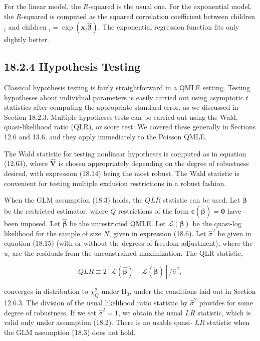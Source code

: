 \documentclass[10pt]{article}
\begin{document}
For the linear model, the $R$-squared is the usual one. For the exponential model, the $R$-squared is computed as the squared correlation coefficient between children ${ }_{i}$ and children $_{i}=\exp \left(\mathbf{x}_{i} \hat{\boldsymbol{\beta}}\right)$. The exponential regression function fits only slightly better.

\subsection*{18.2.4 Hypothesis Testing}
Classical hypothesis testing is fairly straightforward in a QMLE setting. Testing hypotheses about individual parameters is easily carried out using asymptotic $t$ statistics after computing the appropriate standard error, as we discussed in Section 18.2.3. Multiple hypotheses tests can be carried out using the Wald, quasi-likelihood ratio (QLR), or score test. We covered these generally in Sections 12.6 and 13.6, and they apply immediately to the Poisson QMLE.

The Wald statistic for testing nonlinear hypotheses is computed as in equation (12.63), where $\hat{\mathbf{V}}$ is chosen appropriately depending on the degree of robustness desired, with expression (18.14) being the most robust. The Wald statistic is convenient for testing multiple exclusion restrictions in a robust fashion.

When the GLM assumption (18.3) holds, the $Q L R$ statistic can be used. Let $\check{\boldsymbol{\beta}}$ be the restricted estimator, where $Q$ restrictions of the form $\mathbf{c}(\check{\boldsymbol{\beta}})=\mathbf{0}$ have been imposed. Let $\hat{\boldsymbol{\beta}}$ be the unrestricted QMLE. Let $\mathscr{L}(\boldsymbol{\beta})$ be the quasi-log likelihood for the sample of size $N$, given in expression (18.6). Let $\hat{\sigma}^{2}$ be given in equation (18.15) (with or without the degrees-of-freedom adjustment), where the $\hat{u}_{i}$ are the residuals from the unconstrained maximization. The QLR statistic,


\begin{equation*}
Q L R \equiv 2[\mathscr{L}(\hat{\boldsymbol{\beta}})-\mathscr{L}(\check{\boldsymbol{\beta}})] / \hat{\sigma}^{2}, \tag{18.17}
\end{equation*}


converges in distribution to $\chi_{Q}^{2}$ under $\mathrm{H}_{0}$, under the conditions laid out in Section 12.6.3. The division of the usual likelihood ratio statistic by $\hat{\sigma}^{2}$ provides for some degree of robustness. If we set $\hat{\sigma}^{2}=1$, we obtain the usual $L R$ statistic, which is valid only under assumption (18.2). There is no usable quasi- $L R$ statistic when the GLM assumption (18.3) does not hold.
\end{document}
